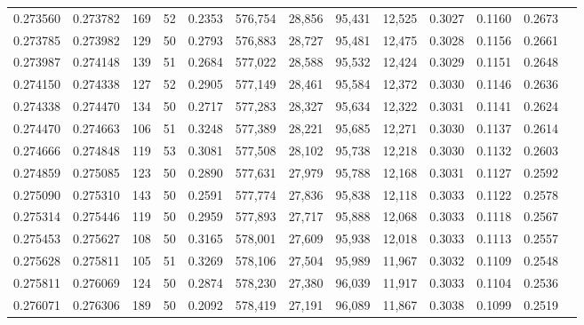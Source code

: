 \begin{tabular}{rrrrrrrrrrrrr}
0.273560 & 0.273782 &   169 &  52 &                                     0.2353 & 576,754 &  28,856 &  95,431 &  12,525 & 0.3027 & 0.1160 & 0.2673 \\
0.273785 & 0.273982 &   129 &  50 &                                     0.2793 & 576,883 &  28,727 &  95,481 &  12,475 & 0.3028 & 0.1156 & 0.2661 \\
0.273987 & 0.274148 &   139 &  51 &                                     0.2684 & 577,022 &  28,588 &  95,532 &  12,424 & 0.3029 & 0.1151 & 0.2648 \\
0.274150 & 0.274338 &   127 &  52 &                                     0.2905 & 577,149 &  28,461 &  95,584 &  12,372 & 0.3030 & 0.1146 & 0.2636 \\
0.274338 & 0.274470 &   134 &  50 &                                     0.2717 & 577,283 &  28,327 &  95,634 &  12,322 & 0.3031 & 0.1141 & 0.2624 \\
0.274470 & 0.274663 &   106 &  51 &                                     0.3248 & 577,389 &  28,221 &  95,685 &  12,271 & 0.3030 & 0.1137 & 0.2614 \\
0.274666 & 0.274848 &   119 &  53 &                                     0.3081 & 577,508 &  28,102 &  95,738 &  12,218 & 0.3030 & 0.1132 & 0.2603 \\
0.274859 & 0.275085 &   123 &  50 &                                     0.2890 & 577,631 &  27,979 &  95,788 &  12,168 & 0.3031 & 0.1127 & 0.2592 \\
0.275090 & 0.275310 &   143 &  50 &                                     0.2591 & 577,774 &  27,836 &  95,838 &  12,118 & 0.3033 & 0.1122 & 0.2578 \\
0.275314 & 0.275446 &   119 &  50 &                                     0.2959 & 577,893 &  27,717 &  95,888 &  12,068 & 0.3033 & 0.1118 & 0.2567 \\
0.275453 & 0.275627 &   108 &  50 &                                     0.3165 & 578,001 &  27,609 &  95,938 &  12,018 & 0.3033 & 0.1113 & 0.2557 \\
0.275628 & 0.275811 &   105 &  51 &                                     0.3269 & 578,106 &  27,504 &  95,989 &  11,967 & 0.3032 & 0.1109 & 0.2548 \\
0.275811 & 0.276069 &   124 &  50 &                                     0.2874 & 578,230 &  27,380 &  96,039 &  11,917 & 0.3033 & 0.1104 & 0.2536 \\
0.276071 & 0.276306 &   189 &  50 &                                     0.2092 & 578,419 &  27,191 &  96,089 &  11,867 & 0.3038 & 0.1099 & 0.2519 \\

\end{tabular}
